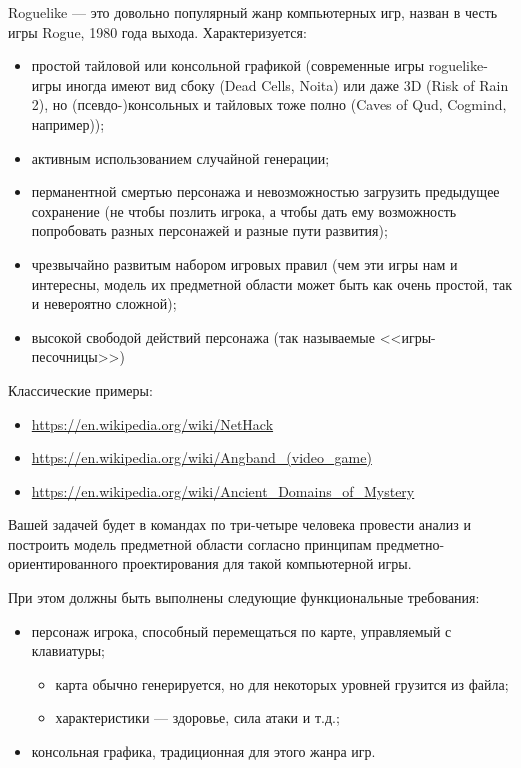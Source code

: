\documentclass[a5paper]{homework}
\begin{document}

Roguelike --- это довольно популярный жанр компьютерных игр, назван в честь игры Rogue, 1980 года выхода. Характеризуется:

\begin{itemize}
    \item простой тайловой или консольной графикой (современные игры roguelike-игры иногда имеют вид сбоку (Dead Cells, Noita) или даже 3D (Risk of Rain 2), но (псевдо-)консольных и тайловых тоже полно (Caves of Qud, Cogmind, например));
    \item активным использованием случайной генерации;
    \item перманентной смертью персонажа и невозможностью загрузить предыдущее сохранение (не чтобы позлить игрока, а чтобы дать ему возможность попробовать разных персонажей и разные пути развития);
    \item чрезвычайно развитым набором игровых правил (чем эти игры нам и интересны, модель их предметной области может быть как очень простой, так и невероятно сложной);
    \item высокой свободой действий персонажа (так называемые <<игры-песочницы>>)
\end{itemize}

Классические примеры:
\begin{itemize}
    \item \url{https://en.wikipedia.org/wiki/NetHack}
    \item \url{https://en.wikipedia.org/wiki/Angband_(video_game)}
    \item \url{https://en.wikipedia.org/wiki/Ancient_Domains_of_Mystery}
\end{itemize}

Вашей задачей будет в командах по три-четыре человека провести анализ и построить модель предметной области согласно принципам предметно-ориентированного проектирования для такой компьютерной игры.

При этом должны быть выполнены следующие функциональные требования:

\begin{itemize}
    \item персонаж игрока, способный перемещаться по карте, управляемый с клавиатуры;
    \begin{itemize}
        \item карта обычно генерируется, но для некоторых уровней грузится из файла;
        \item характеристики --- здоровье, сила атаки и т.д.;
    \end{itemize}
    \item консольная графика, традиционная для этого жанра игр.
\end{itemize}
\end{document}
